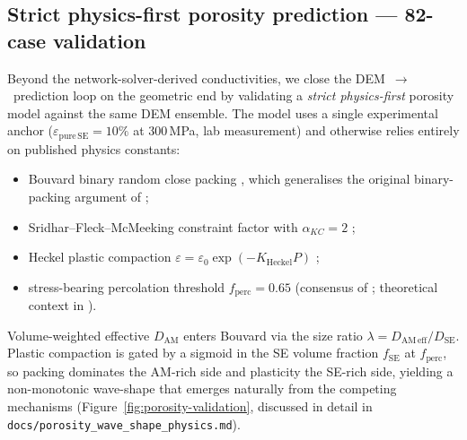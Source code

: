 \documentclass[11pt, a4paper]{article}
\begin{document}
\subsection{Strict physics-first porosity prediction --- 82-case validation}
\label{sec:results-porosity}
Beyond the network-solver-derived conductivities, we close the
DEM~$\to$~prediction loop on the geometric end by validating a
\emph{strict physics-first} porosity model against the same DEM
ensemble. The model uses a single experimental anchor
($\varepsilon_{\mathrm{pure\,SE}} = 10\%$ at 300\,MPa, lab
measurement) and otherwise relies entirely on published physics
constants:
\begin{itemize}
\item Bouvard binary random close packing \citep{Bouvard2004,
      Sohn1968, Yi2004, Hopkins2013}, which generalises the
      original binary-packing argument of \citet{Furnas1929};
\item Sridhar--Fleck--McMeeking constraint factor with
      $\alpha_{KC} = 2$ \citep{Sridhar2000};
\item Heckel plastic compaction $\varepsilon = \varepsilon_0
      \exp(-K_{\mathrm{Heckel}} P)$ \citep{Heckel1961,
      Sonnergaard1999};
\item stress-bearing percolation threshold $f_{\mathrm{perc}} =
      0.65$ (consensus of \citealp{Storakers2000, Bouvard2000,
      Jacobs2009, Henkes2005, LiuYin2025}; theoretical context in
      \citealp{StaufferAharony1994, Kirkpatrick1973, Sahimi1994}).
\end{itemize}
Volume-weighted effective $D_{\mathrm{AM}}$ enters Bouvard via the
size ratio $\lambda = D_{\mathrm{AM\,eff}} / D_{\mathrm{SE}}$.
Plastic compaction is gated by a sigmoid in the SE volume
fraction $f_{\mathrm{SE}}$ at $f_{\mathrm{perc}}$, so packing
dominates the AM-rich side and plasticity the SE-rich side, yielding
a non-monotonic wave-shape that emerges naturally from the
competing mechanisms (Figure~\ref{fig:porosity-validation},
discussed in detail in
\texttt{docs/porosity\_wave\_shape\_physics.md}).
\end{document}

